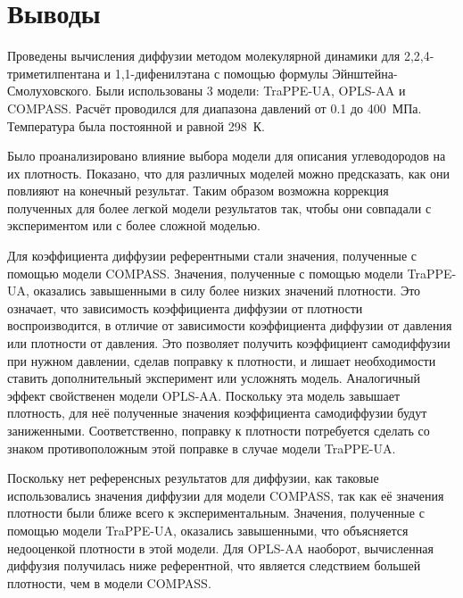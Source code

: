 \section{Выводы}

Проведены вычисления диффузии методом молекулярной динамики для 2,2,4-триметилпентана и 1,1-дифенилэтана с помощью формулы Эйнштейна-Смолуховского. Были использованы 3 модели: TraPPE-UA, OPLS-AA и COMPASS. Расчёт проводился для диапазона давлений от 0.1 до 400~МПа. Температура была постоянной и равной 298~К. 

Было проанализировано влияние выбора модели для описания углеводородов на их плотность. Показано, что для различных моделей можно предсказать, как они повлияют на конечный результат. Таким образом возможна коррекция полученных для более легкой модели результатов так, чтобы они совпадали с экспериментом или с более сложной моделью. 

Для коэффициента диффузии референтными стали значения, полученные с помощью модели COMPASS. Значения, полученные с помощью модели TraPPE-UA, оказались завышенными в силу более низких значений плотности. Это означает, что зависимость коэффициента диффузии от плотности воспроизводится, в отличие от зависимости коэффициента диффузии от давления или плотности от давления. Это позволяет получить коэффициент самодиффузии при нужном давлении, сделав поправку к плотности, и лишает необходимости ставить дополнительный эксперимент или усложнять модель. Аналогичный эффект свойственен модели OPLS-AA. Поскольку эта модель завышает плотность, для неё полученные значения коэффициента самодиффузии будут заниженными. Соответственно, поправку к плотности потребуется сделать со знаком противоположным этой поправке в случае модели TraPPE-UA.   

Поскольку нет референсных результатов для диффузии, как таковые использовались значения диффузии для модели COMPASS, так как её значения плотности были ближе всего к экспериментальным. Значения, полученные с помощью модели TraPPE-UA, оказались завышенными, что объясняется недооценкой плотности в этой модели. Для OPLS-AA наоборот, вычисленная диффузия получилась ниже референтной, что является следствием большей плотности, чем в модели COMPASS.    
